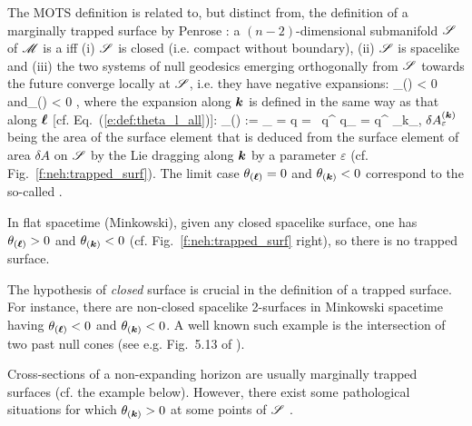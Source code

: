 The MOTS definition is related to, but distinct from, the definition of a
marginally trapped surface by Penrose \cite{Penro65}: a $(n-2)$-dimensional
submanifold $\mathscr{S}$ of $\mathscr{M}$ is a 
 iff (i) $\mathscr{S}$ is
closed (i.e. compact without boundary), (ii) $\mathscr{S}$ is spacelike and (iii)
the two systems of null geodesics emerging orthogonally from $\mathscr{S}$ towards the future
converge locally at $\mathscr{S}$, i.e. they have negative expansions:
\be
    \theta_{(\wl)} < 0 \quad\mbox{and}\quad \theta_{()} < 0 ,
\ee
where the expansion along $\bm{k}$ is defined in the same way as that along
$\bm{\ell}$ [cf. Eq.~(\ref{e:def:theta_l_all})]:
\be \label{e:neh:expansion_k}
    \theta_{()} := \lim_{\varepsilon{}} 
        =   \ln q
        =  \, q^{\mu\nu}  q_{\mu\nu}
        = q^{\mu\nu} \nabla_\mu k_\nu ,
\ee
$\delta A^{(\bm{k})}_\varepsilon$ being the area of the surface element
that is deduced from the surface element of area $\delta A$ on $\mathscr{S}$ by the
Lie dragging along $\bm{k}$ by a parameter $\varepsilon$ (cf. Fig.~\ref{f:neh:trapped_surf}).
The limit case $\theta_{(\bm{\ell})} = 0$ and $\theta_{(\bm{k})}<0$ correspond
to the so-called .

In flat spacetime (Minkowski), given any closed spacelike surface,
one has $\theta_{(\bm{\ell})} > 0$ and $\theta_{(\bm{k})} < 0$ (cf. Fig.~\ref{f:neh:trapped_surf} right), so there
is no trapped surface.

\begin{remark}
The hypothesis of \emph{closed} surface is crucial in the definition of a
trapped surface. For instance, there are non-closed spacelike 2-surfaces in
Minkowski spacetime having $\theta_{(\bm{\ell})} < 0$ and $\theta_{(\bm{k})} < 0$.
A well known such example is the intersection of two past null cones (see e.g.
Fig.~5.13 of \cite{FroloN98}).
\end{remark}

Cross-sections of a non-expanding horizon are usually marginally trapped surfaces
(cf. the example below).
However, there exist some pathological situations for
which $\theta_{(\bm{k})} > 0$ at some points of $\mathscr{S}$ \cite{GerocH82}.

